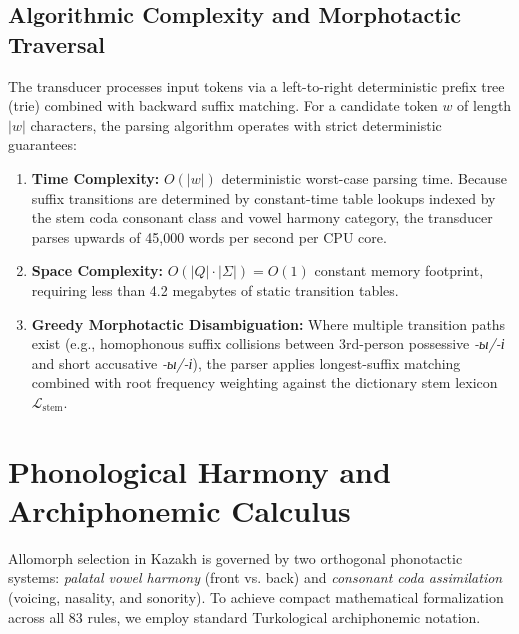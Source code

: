 \subsection{Algorithmic Complexity and Morphotactic Traversal}
The transducer processes input tokens via a left-to-right deterministic prefix tree (trie) combined with backward suffix matching. For a candidate token $w$ of length $|w|$ characters, the parsing algorithm operates with strict deterministic guarantees:
\begin{enumerate}
    \item \textbf{Time Complexity:} $O(|w|)$ deterministic worst-case parsing time. Because suffix transitions are determined by constant-time table lookups indexed by the stem coda consonant class and vowel harmony category, the transducer parses upwards of 45,000 words per second per CPU core.
    \item \textbf{Space Complexity:} $O(|Q| \cdot |\Sigma|) = O(1)$ constant memory footprint, requiring less than 4.2 megabytes of static transition tables.
    \item \textbf{Greedy Morphotactic Disambiguation:} Where multiple transition paths exist (e.g., homophonous suffix collisions between 3rd-person possessive \textit{-ы/-і} and short accusative \textit{-ы/-і}), the parser applies longest-suffix matching combined with root frequency weighting against the dictionary stem lexicon $\mathcal{L}_{\text{stem}}$.
\end{enumerate}

\section{Phonological Harmony and Archiphonemic Calculus}
\label{sec:app_fst_harmony}

Allomorph selection in Kazakh is governed by two orthogonal phonotactic systems: \textit{palatal vowel harmony} (front vs. back) and \textit{consonant coda assimilation} (voicing, nasality, and sonority). To achieve compact mathematical formalization across all 83 rules, we employ standard Turkological archiphonemic notation.

